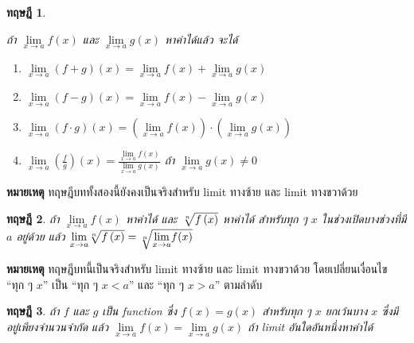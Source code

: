 \documentclass[
]{book}
\newtheorem{theorem}{ทฤษฎี}[chapter]
\theoremstyle{definition}
\theoremstyle{definition}
\theoremstyle{definition}
\theoremstyle{definition}
\theoremstyle{remark}
\begin{document}
\begin{theorem}
\protect\hypertarget{thm:thm-limit-2}{}\label{thm:thm-limit-2}

ถ้า \(\underset{x\rightarrow a}{\lim}f(x)\) และ
\(\underset{x\rightarrow a}{\lim}g(x)\) หาค่าได้แล้ว จะได้

\begin{enumerate}
\def\labelenumi{\arabic{enumi}.}
\item
  \(\underset{x\rightarrow a}{\lim}(f+g)(x)=\underset{x\rightarrow a}{\lim}f(x)+\underset{x\rightarrow a}{\lim}g(x)\)
\item
  \(\underset{x\rightarrow a}{\lim}(f-g)(x)=\underset{x\rightarrow a}{\lim}f(x)-\underset{x\rightarrow a}{\lim}g(x)\)
\item
  \(\underset{x\rightarrow a}{\lim}(f\cdot g)(x)=\left( \underset{x\rightarrow a}{\lim}f(x)\right) \cdot \left( \underset{x\rightarrow a}{\lim}g(x)\right)\)
\item
  \(\underset{x\rightarrow a}{\lim}\left( \frac{f}{g}\right) (x)=\frac{\underset{x\rightarrow a}{\lim}f(x)}{\underset{x\rightarrow a}{\lim}g(x)}\)
  ถ้า \(\underset{x\rightarrow a}{\lim}g(x)\neq 0\)
\end{enumerate}

\end{theorem}

\textbf{หมายเหตุ} ทฤษฎีบททั้งสองนี้ยังคงเป็นจริงสำหรับ limit ทางซ้าย และ limit ทางขวาด้วย

\begin{theorem}
\protect\hypertarget{thm:thm-limit-3}{}\label{thm:thm-limit-3}ถ้า \(\underset{x\rightarrow a}{\lim}f(x)\) หาค่าได้ และ
\(\root{n}\of{f\left( x\right) }\) หาค่าได้ สำหรับทุก ๆ \(x\) ในช่วงเปิดบางช่วงที่มี
\(a\) อยู่ด้วย แล้ว
\(\underset{x\rightarrow a}{\lim}\root{n}\of{f\left( x\right) }=\root{n}\of{\underset{x\rightarrow a}{\lim}f(x)}\)
\end{theorem}

\textbf{หมายเหตุ} ทฤษฎีบทนี้เป็นจริงสำหรับ limit ทางซ้าย และ limit ทางขวาด้วย
โดยเปลี่ยนเงื่อนไข ``ทุก ๆ \(x\)'' เป็น ``ทุก ๆ \(x < a\)'' และ ``ทุก ๆ \(x > a\)'' ตามลำดับ

\begin{theorem}
\protect\hypertarget{thm:thm-limit-4}{}\label{thm:thm-limit-4}ถ้า \(f\) และ \(g\) เป็น function ซึ่ง \(f\left( x\right) =g\left( x\right)\)
สำหรับทุก ๆ \(x\) ยกเว้นบาง \(x\) ซึ่งมีอยู่เพียงจำนวนจำกัด แล้ว
\(\underset{x\rightarrow a}{\lim}f(x)=\underset{x\rightarrow a}{\lim}g(x)\)
ถ้า limit อันใดอันหนึ่งหาค่าได้
\end{theorem}
\end{document}
